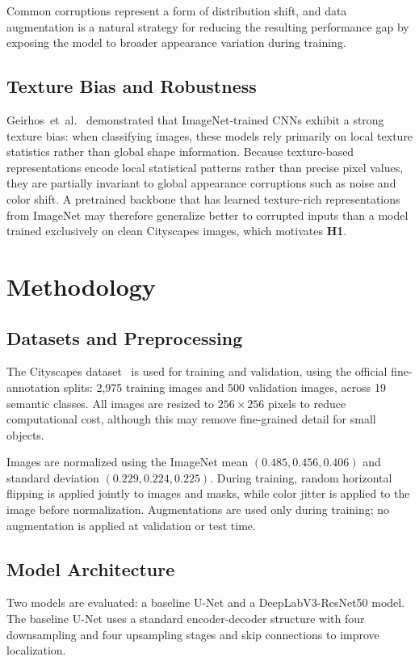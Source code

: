 \documentclass[conference]{IEEEtran}
\begin{document}
Common corruptions represent a form of distribution shift, and data augmentation is a natural strategy for reducing the resulting performance gap by exposing the model to broader appearance variation during training.

\subsection{Texture Bias and Robustness}
Geirhos~et~al.~\cite{geirhos2019} demonstrated that ImageNet-trained CNNs exhibit a strong texture bias: when classifying images, these models rely primarily on local texture statistics rather than global shape information. Because texture-based representations encode local statistical patterns rather than precise pixel values, they are partially invariant to global appearance corruptions such as noise and color shift. A pretrained backbone that has learned texture-rich representations from ImageNet may therefore generalize better to corrupted inputs than a model trained exclusively on clean Cityscapes images, which motivates \textbf{H1}.

\section{Methodology}

\subsection{Datasets and Preprocessing}
The Cityscapes dataset~\cite{cordts2016cityscapes} is used for training and validation, using the official fine-annotation splits: 2,975 training images and 500 validation images, across 19 semantic classes. All images are resized to $256 \times 256$ pixels to reduce computational cost, although this may remove fine-grained detail for small objects.

Images are normalized using the ImageNet mean $(0.485, 0.456, 0.406)$ and standard deviation $(0.229, 0.224, 0.225)$. During training, random horizontal flipping is applied jointly to images and masks, while color jitter is applied to the image before normalization. Augmentations are used only during training; no augmentation is applied at validation or test time.

\subsection{Model Architecture}
Two models are evaluated: a baseline U-Net and a DeepLabV3-ResNet50 model. The baseline U-Net uses a standard encoder-decoder structure with four downsampling and four upsampling stages and skip connections to improve localization.
\end{document}
